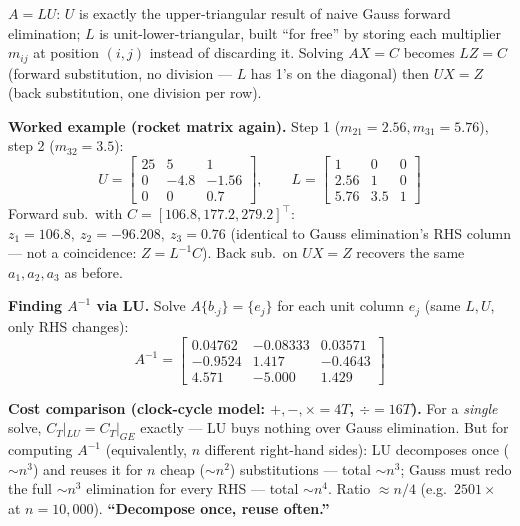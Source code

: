 \begin{defbox}
$A=LU$: $U$ is exactly the upper-triangular result of naive Gauss forward elimination; $L$ is unit-lower-triangular, built ``for free'' by storing each multiplier $m_{ij}$ at position $(i,j)$ instead of discarding it. Solving $AX=C$ becomes $LZ=C$ (forward substitution, no division — $L$ has 1's on the diagonal) then $UX=Z$ (back substitution, one division per row).
\end{defbox}

\begin{examplebox}
\textbf{Worked example (rocket matrix again).} Step 1 ($m_{21}{=}2.56,m_{31}{=}5.76$), step 2 ($m_{32}{=}3.5$):
\[
U=\begin{bmatrix}25&5&1\\0&-4.8&-1.56\\0&0&0.7\end{bmatrix}, \qquad L=\begin{bmatrix}1&0&0\\2.56&1&0\\5.76&3.5&1\end{bmatrix}
\]
Forward sub.\ with $C=[106.8,177.2,279.2]^\top$: $z_1=106.8,\ z_2=-96.208,\ z_3=0.76$ (identical to Gauss elimination's RHS column — not a coincidence: $Z=L^{-1}C$). Back sub.\ on $UX=Z$ recovers the same $a_1,a_2,a_3$ as before.

\textbf{Finding $A^{-1}$ via LU.} Solve $A\{b_{\cdot j}\}=\{e_j\}$ for each unit column $e_j$ (same $L,U$, only RHS changes):
\[
A^{-1} = \begin{bmatrix}0.04762&-0.08333&0.03571\\-0.9524&1.417&-0.4643\\4.571&-5.000&1.429\end{bmatrix}
\]
\end{examplebox}

\begin{keypoint}
\textbf{Cost comparison (clock-cycle model: $+,-,\times=4T$, $\div=16T$).} For a \emph{single} solve, $C_T|_{LU}=C_T|_{GE}$ exactly — LU buys nothing over Gauss elimination. But for computing $A^{-1}$ (equivalently, $n$ different right-hand sides): LU decomposes once ($\sim n^3$) and reuses it for $n$ cheap ($\sim n^2$) substitutions — total $\sim n^3$; Gauss must redo the full $\sim n^3$ elimination for every RHS — total $\sim n^4$. Ratio $\approx n/4$ (e.g.\ $2501\times$ at $n=10{,}000$). \textbf{``Decompose once, reuse often.''}
\end{keypoint}

